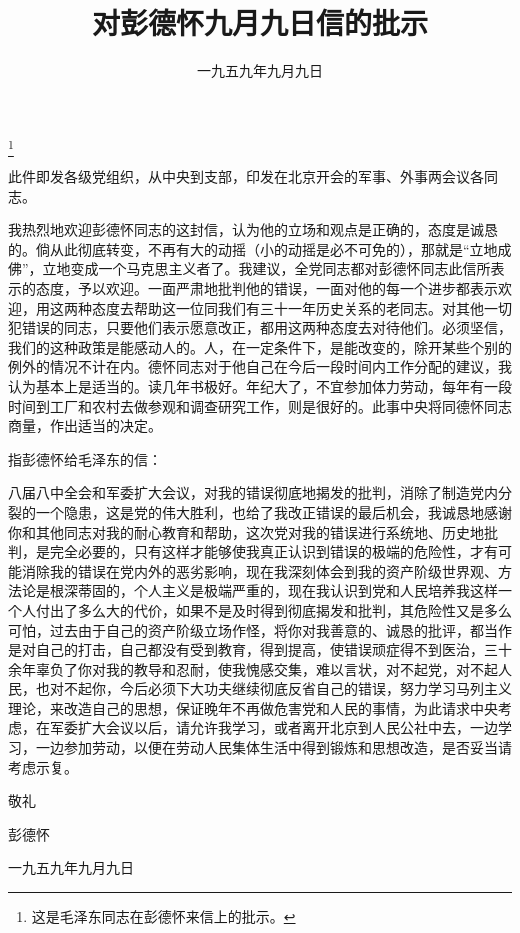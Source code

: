 
\title{对彭德怀九月九日信的批示}
\date{一九五九年九月九日}
\thanks{这是毛泽东同志在彭德怀来信上的批示。}
\maketitle


此件即发各级党组织，从中央到支部，印发在北京开会的军事、外事两会议各同志。

我热烈地欢迎彭德怀同志的这封信，认为他的立场和观点是正确的，态度是诚恳的。倘从此彻底转变，不再有大的动摇（小的动摇是必不可免的），那就是“立地成佛”，立地变成一个马克思主义者了。我建议，全党同志都对彭德怀同志此信所表示的态度，予以欢迎。一面严肃地批判他的错误，一面对他的每一个进步都表示欢迎，用这两种态度去帮助这一位同我们有三十一年历史关系的老同志。对其他一切犯错误的同志，只要他们表示愿意改正，都用这两种态度去对待他们。必须坚信，我们的这种政策是能感动人的。人，在一定条件下，是能改变的，除开某些个别的例外的情况不计在内。德怀同志对于他自己在今后一段时间内工作分配的建议，我认为基本上是适当的。读几年书极好。年纪大了，不宜参加体力劳动，每年有一段时间到工厂和农村去做参观和调查研究工作，则是很好的。此事中央将同德怀同志商量，作出适当的决定。

\begin{maonote}
指彭德怀给毛泽东的信：


八届八中全会和军委扩大会议，对我的错误彻底地揭发的批判，消除了制造党内分裂的一个隐患，这是党的伟大胜利，也给了我改正错误的最后机会，我诚恳地感谢你和其他同志对我的耐心教育和帮助，这次党对我的错误进行系统地、历史地批判，是完全必要的，只有这样才能够使我真正认识到错误的极端的危险性，才有可能消除我的错误在党内外的恶劣影响，现在我深刻体会到我的资产阶级世界观、方法论是根深蒂固的，个人主义是极端严重的，现在我认识到党和人民培养我这样一个人付出了多么大的代价，如果不是及时得到彻底揭发和批判，其危险性又是多么可怕，过去由于自己的资产阶级立场作怪，将你对我善意的、诚恳的批评，都当作是对自己的打击，自己都没有受到教育，得到提高，使错误顽症得不到医治，三十余年辜负了你对我的教导和忍耐，使我愧感交集，难以言状，对不起党，对不起人民，也对不起你，今后必须下大功夫继续彻底反省自己的错误，努力学习马列主义理论，来改造自己的思想，保证晚年不再做危害党和人民的事情，为此请求中央考虑，在军委扩大会议以后，请允许我学习，或者离开北京到人民公社中去，一边学习，一边参加劳动，以便在劳动人民集体生活中得到锻炼和思想改造，是否妥当请考虑示复。

敬礼

彭德怀

一九五九年九月九日
\end{maonote}
